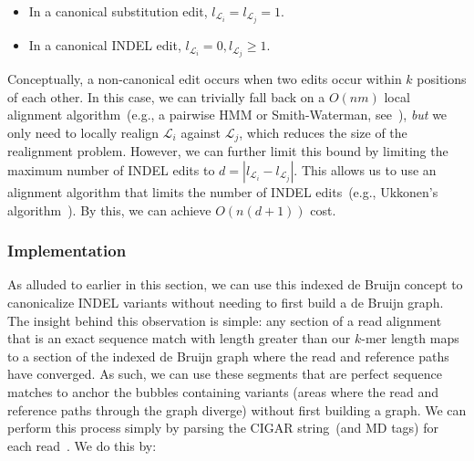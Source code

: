 \documentclass{bioinfo}
\begin{document}
\begin{methods}
\begin{itemize}
\item In a canonical substitution edit, $l_{\mathcal{L}_i} = l_{\mathcal{L}_j} = 1$.
\item In a canonical INDEL edit, $l_{\mathcal{L}_i} = 0, l_{\mathcal{L}_j} \ge 1$.
\end{itemize}

Conceptually, a non-canonical edit occurs when two edits occur within $k$ positions of each other. In
this case, we can trivially fall back on a $O(nm)$ local alignment algorithm~(e.g., a pairwise HMM or
Smith-Waterman, see~\citet{durbin98, smith81}), \emph{but} we only need to locally realign
$\mathcal{L}_i$ against $\mathcal{L}_j$, which reduces the size of the realignment problem. However, we
can further limit this bound by limiting the maximum number of INDEL edits to $d = | l_{\mathcal{L}_i} -
l_{\mathcal{L}_j} |$. This allows us to use an alignment algorithm that limits the number of INDEL
edits~(e.g., Ukkonen's algorithm~\citep{ukkonen85}). By this, we can achieve $O(n(d + 1))$ cost.

\subsubsection{Implementation}
\label{sec:implementation}

As alluded to earlier in this section, we can use this indexed de Bruijn concept
to canonicalize INDEL variants without needing to first build a de Bruijn graph.
The insight behind this observation is simple: any section of a read alignment
that is an exact sequence match with length greater than our $k$-mer length maps
to a section of the indexed de Bruijn graph where the read and reference paths
have converged. As such, we can use these segments that are perfect sequence
matches to anchor the bubbles containing variants (areas where the read and
reference paths through the graph diverge) without first building a graph.
We can perform this process simply by parsing the CIGAR string~(and MD tags)
for each read~\citep{li09}. We do this by:


\end{methods}
\end{document}

